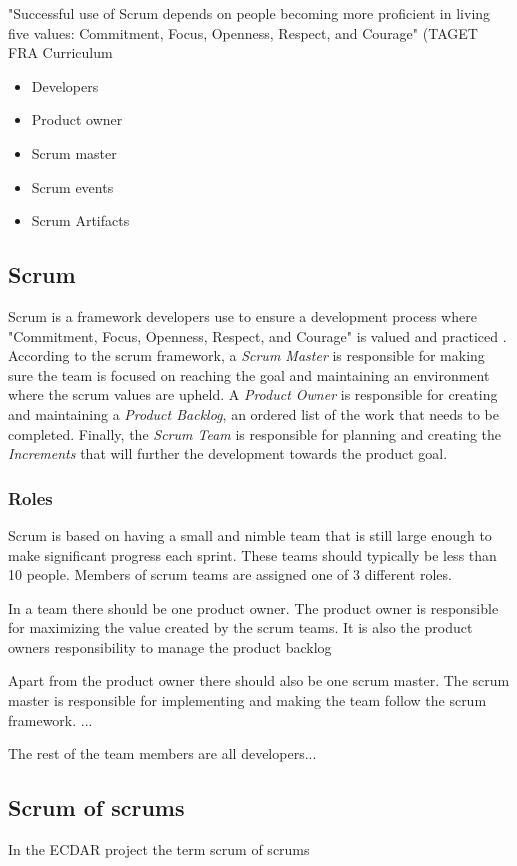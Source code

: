 
"Successful use of Scrum depends on people becoming more proficient in living five values:
Commitment, Focus, Openness, Respect, and Courage" (TAGET FRA Curriculum

\begin{itemize}
\item Developers
\item Product owner
\item Scrum master
\item Scrum events
\item Scrum Artifacts
\end{itemize}


\subsection{Scrum}
Scrum is a framework developers use to ensure a development process where "Commitment, Focus, Openness, Respect, and Courage" is valued and practiced \cite{schwaber_sutherland_2022}. According to the scrum framework, a \emph{Scrum Master} is responsible for making sure the team is focused on reaching the goal and maintaining an environment where the scrum values are upheld. A \emph{Product Owner} is responsible for creating and maintaining a \emph{Product Backlog}, an ordered list of the work that needs to be completed. Finally, the \emph{Scrum Team} is responsible for planning and creating the \emph{Increments} that will further the development towards the product goal.

\subsubsection{Roles}
Scrum is based on having a small and nimble team that is still large enough to make significant progress each sprint. 
These teams should typically be less than 10 people.
Members of scrum teams are assigned one of 3 different roles. \cite{schwaber_sutherland_2022}

In a team there should be one product owner. 
The product owner is responsible for maximizing the value created by the scrum teams. It is also the product owners responsibility to manage the product backlog \cite{schwaber_sutherland_2022}

Apart from the product owner there should also be one scrum master.
The scrum master is responsible for implementing and making the team follow the scrum framework. 
... \cite{schwaber_sutherland_2022}

The rest of the team members are all developers...




\subsection{Scrum of scrums}
In the ECDAR project the term scrum of scrums  